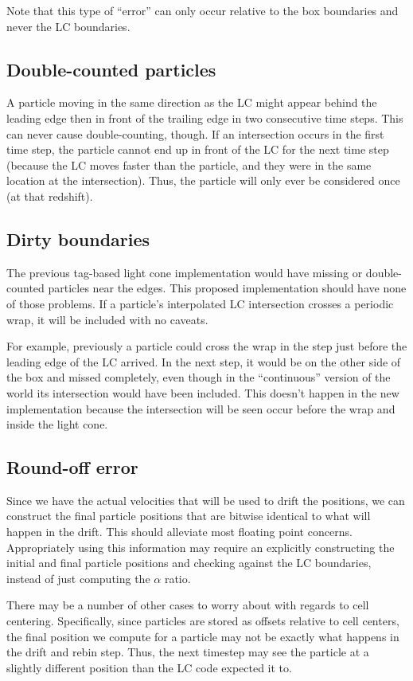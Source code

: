 \documentclass[a4paper]{article}
\begin{document}
Note that this type of ``error'' can only occur relative to the box boundaries and never the LC boundaries.

\subsection{Double-counted particles}
A particle moving in the same direction as the LC might appear behind the leading edge then in front of the trailing edge in two consecutive time steps.  This can never cause double-counting, though.  If an intersection occurs in the first time step, the particle cannot end up in front of the LC for the next time step (because the LC moves faster than the particle, and they were in the same location at the intersection).  Thus, the particle will only ever be considered once (at that redshift).

\subsection{Dirty boundaries}\label{sec:boundaries}
The previous tag-based light cone implementation would have missing or double-counted particles near the edges.  This proposed implementation should have none of those problems. If a particle's interpolated LC intersection crosses a periodic wrap, it will be included with no caveats.

For example, previously a particle could cross the wrap in the step just before the leading edge of the LC arrived.  In the next step, it would be on the other side of the box and missed completely, even though in the ``continuous'' version of the world its intersection would have been included.  This doesn't happen in the new implementation because the intersection will be seen occur before the wrap and inside the light cone.

\subsection{Round-off error}\label{sec:roundoff}
Since we have the actual velocities that will be used to drift the positions, we can construct the final particle positions that are bitwise identical to what will happen in the drift.  This should alleviate most floating point concerns.  Appropriately using this information may require an explicitly constructing the initial and final particle positions and checking against the LC boundaries, instead of just computing the $\alpha$ ratio.

There may be a number of other cases to worry about with regards to cell centering.  Specifically, since particles are stored as offsets relative to cell centers, the final position we compute for a particle may not be exactly what happens in the drift and rebin step.  Thus, the next timestep may see the particle at a slightly different position than the LC code expected it to.
\end{document}
